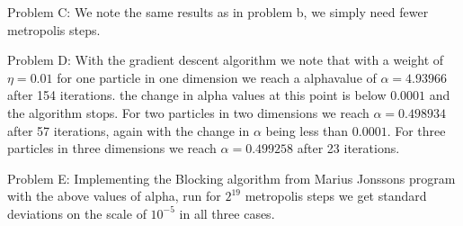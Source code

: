 \documentclass[a4paper, 10pt, english]{revtex4-2} %
\begin{document}
    Problem C: We note the same results as in problem b, we simply need fewer metropolis steps.

    Problem D: With the gradient descent algorithm we note that with a weight of $\eta = 0.01$ for one particle in one dimension we reach a alphavalue of $\alpha = 4.93966$ after 154 iterations. the change in alpha values at this point is below $0.0001$ and the algorithm stops.
    For two particles in two dimensions we reach $\alpha = 0.498934$ after 57 iterations, again with the change in $\alpha$ being less than $0.0001$.
    For three particles in three dimensions we reach $\alpha = 0.499258$ after 23 iterations.

    Problem E: Implementing the Blocking algorithm from Marius Jonssons program with the above values of alpha, run for $2^{19}$ metropolis steps we get standard deviations on the scale of $10^{-5}$ in all three cases.
\end{document}
